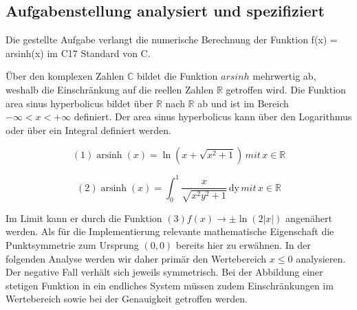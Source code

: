 \documentclass[course=erap] {aspdoc}
\begin{document}
    \subsection{Aufgabenstellung analysiert und spezifiziert}
    Die gestellte Aufgabe verlangt die numerische Berechnung der Funktion f(x) = arsinh(x) im C17 Standard von C.


    Über den komplexen Zahlen $\mathbb{C}$ bildet die Funktion $arsinh$ mehrwertig ab, weshalb die Einschränkung auf die reellen Zahlen $\mathbb{R}$ getroffen wird.
    Die Funktion area sinus hyperbolicus bildet über $\mathbb{R}$ nach $\mathbb{R}$ ab und ist im Bereich $-\infty < x < + \infty$ definiert.
    Der area sinus hyperbolicus kann über den Logarithmus oder über ein Integral definiert werden.

    $$ (1) \operatorname{arsinh}(x) = \ln \left(x + \sqrt{x^2 + 1} \right) \, mit \, x \in \mathbb{R}$$

    $$ (2) \operatorname{arsinh}(x) = \int_{0}^{1} \frac{x}{\sqrt{x^2 y^2 + 1}} \,\mathrm{dy} \, mit \, x \in \mathbb{R} $$

    Im Limit kann er durch die Funktion $ (3) f(x)\to \pm \ln(2|x|)$ angenähert werden.
    Als für die Implementierung relevante mathematische Eigenschaft die Punktsymmetrie zum Ursprung $(0,0)$ bereits hier zu erwähnen. In der folgenden Analyse werden wir daher primär den Wertebereich $x \leq 0$ analysieren. Der negative Fall verhält sich jeweils symmetrisch.
    Bei der Abbildung einer stetigen Funktion in ein endliches System müssen zudem Einschränkungen im Wertebereich sowie bei der Genauigkeit getroffen werden.
\end{document}
